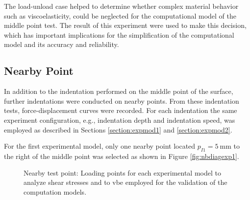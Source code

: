 The load-unload case helped to determine whether complex material behavior such as 
viscoelasticity, could be neglected for the computational model of the middle point test.
The result of this experiment were used to make this decision, which has important 
implications for the simplification of the computational model and its accuracy and reliability.

\subsection*{Nearby Point}
\label{subsection:nearbypoint}
In addition to the indentation performed on the middle point of the surface, further 
indentations were conducted on nearby points. From these indentation tests, force-displacement 
curves were recorded. For each indentation the same experiment configuration, 
e.g., indentation depth and indentation 
speed, was employed as described in Sections \ref{section:expmod1} and \ref{section:expmod2}.

For the first experimental model, only one nearby point located $p_{I1} = \SI{5}{\milli \m}$ 
to the right of the middle point was selected as shown in Figure \ref{fig:nbdiagexp1}.

\begin{figure}%
    \centering
   \qquad
   \caption{Nearby test point: Loading points for each experimental model to analyze shear stresses and to vbe employed for the validation of the computation models.}%
   \label{fig:nbexp}%
\end{figure}

